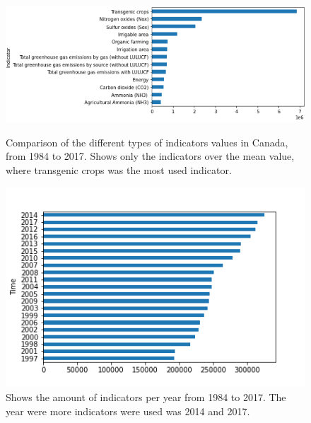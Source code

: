 \documentclass[11pt]{article}
\numberwithin{equation}{section}
\begin{document}
\begin{figure}[t]
\centering
\includegraphics[width=0.50\paperwidth, clip=true, trim=0mm 0mm 0mm 0mm]{figures/Indicator_Value}\\

\caption{ Comparison of the different types of indicators  values in Canada, from 1984 to 2017. Shows only the indicators over the mean value, where transgenic crops was the most used indicator.
}
\label{Example1fig}
\end{figure}
\begin{figure}[t]
\centering
\includegraphics[width=0.30\paperwidth, clip=true, trim=0mm 0mm 0mm 0mm]{figures/Time_Value}\qquad

\caption{Shows  the amount of indicators per year from 1984 to 2017. The year were more  indicators were used was 2014 and 2017.
}
\label{Example2fig}
\end{figure}
\end{document}
